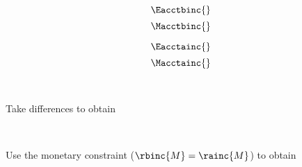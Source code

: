 

\begin{landscape}

\linespread{1}


\sectionsep{}

{
  \begin{equation}
  \Eacctbinc{}
  \end{equation}
}
{
  \begin{equation}
  \Macctbinc{}
  \end{equation}
}

\sectionsep{}

{
  \begin{equation}
  \Eacctainc{}
  \end{equation}
}
{
  \begin{equation}
  \Macctainc{}
  \end{equation}
}

\sectionsep{}

\derivsection{}
{
  ~

  Take differences to obtain

}
{
  ~

  Use the monetary constraint ($\rbinc{M} = \rainc{M}$) to obtain
}
\end{landscape}